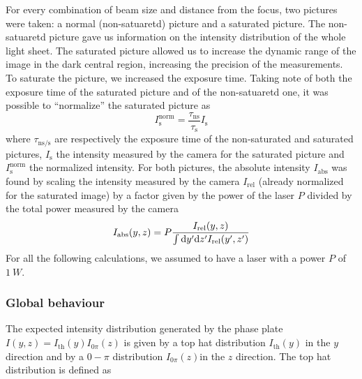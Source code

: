 For every combination of beam size and distance from the focus, two pictures were taken: a normal (non-satuaretd) picture and a saturated picture. The non-satuaretd picture gave us information on the intensity distribution of the whole light sheet. The saturated picture allowed us to increase the dynamic range of the image in the dark central region, increasing the precision of the measurements.
To saturate the picture, we increased the exposure time. Taking note of both the exposure time of the saturated picture and of the non-satuaretd one, it was possible to \enquote{normalize} the saturated picture as
\begin{equation}
    I_\text{s}^\text{norm} = \frac{\tau_\text{ns}}{\tau_\text{s}} I_\text{s}
\end{equation}
where $\tau_\text{ns/s}$ are respectively the exposure time of the non-saturated and saturated pictures, $I_\text{s}$ the intensity measured by the camera for the saturated picture and $I_\text{s}^\text{norm}$ the normalized intensity.
For both pictures, the absolute intensity $I_\text{abs}$ was found by scaling the intensity measured by the camera $I_\text{rel}$ (already normalized for the saturated image) by a factor given by the power of the laser $P$ divided by the total power measured by the camera
\begin{equation}
    I_\text{abs}(y,z) = P\frac{I_\text{rel}(y,z)}{
        \int \differential y' \differential z' I_\text{rel}(y',z')}
\end{equation}
For all the following calculations, we assumed to have a laser with a power $P$ of $\SI{1}{W}$.

\subsubsection{Global behaviour}
The expected intensity distribution generated by the phase plate $I(y,z) = I_\text{th}(y) I_{0\pi}(z)$ is given by a top hat distribution $I_\text{th}(y)$ in the $y$ direction and by a $0-\pi$ distribution $I_{0\pi}(z)$in the $z$ direction. The top hat distribution is defined as

